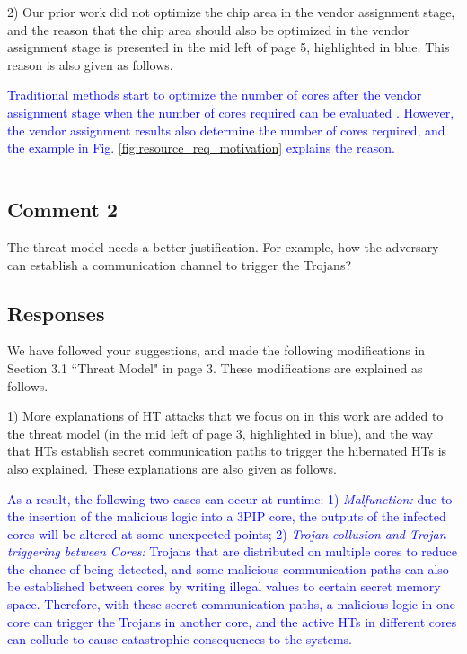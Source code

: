 \documentclass[10pt,journal, compsoc]{IEEEtran}
\begin{document}
\vspace{0.5em}
2) Our prior work did not optimize the chip area in the vendor assignment stage, and the reason that the chip area should also be optimized in the vendor assignment stage is presented in the mid left of page 5, highlighted in blue. This reason is also given as follows.

\textcolor{blue}{Traditional methods start to optimize the number of cores after the vendor assignment stage when the number of cores required can be evaluated \cite{article:YS, article:XC, article:CL, article:NW}. However, the vendor assignment results also determine the number of cores required, and the example in Fig. \ref{fig:resource_req_motivation} explains the reason.}

\noindent\rule[0.25\baselineskip]{252pt}{1pt}


\subsection*{Comment 2}
The threat model needs a better justification. For example, how the adversary can establish a communication channel to trigger the Trojans?

\subsection*{Responses}
We have followed your suggestions, and made the following modifications in Section 3.1 ``Threat Model" in page 3. These modifications are explained as follows.

\vspace{0.5em}
1) More explanations of HT attacks that we focus on in this work are added to the threat model (in the mid left of page 3, highlighted in blue), and the way that HTs establish secret communication paths to trigger the hibernated HTs is also explained. These explanations are also given as follows.

\textcolor{blue}{As a result, the following two cases can occur at runtime: 1) \textit{Malfunction:} due to the insertion of the malicious logic into a 3PIP core, the outputs of the infected cores will be altered at some unexpected points; 2) \textit{Trojan collusion and Trojan triggering between Cores:} Trojans that are distributed on multiple cores to reduce the chance of being detected, and some malicious communication paths can also be established between cores by writing illegal values to certain secret memory space. Therefore, with these secret communication paths, a malicious logic in one core can trigger the Trojans in another core, and the active HTs in different cores can collude to cause catastrophic consequences to the systems.}
\end{document}
